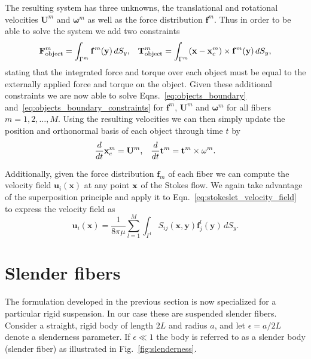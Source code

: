 The resulting system has three unknowns, the translational and rotational velocities $\mathbf{U}^m$ and $\mathbf{\omega}^m$ as well as the force distribution $\mathbf{f}^m$. Thus in order to be able to solve the system we add two constraints
\begin{equation}
	\label{eq:objects_boundary_constraints}
	\mathbf{F}_{\text{object}}^m = \int_{\Gamma^m} \mathbf{f}^m(\mathbf{y}) \, dS_y\text{,} \quad \mathbf{T}_{\text{object}}^m = \int_{\Gamma^m} (\mathbf{x} - \mathbf{x}_c^m) \times \mathbf{f}^m(\mathbf{y}) \, dS_y \text{,}
\end{equation}
stating that the integrated force and torque over each object must be equal to the externally applied force and torque on the object. Given these additional constraints we are now able to solve Eqns.~\eqref{eq:objects_boundary} and~\eqref{eq:objects_boundary_constraints} for $\mathbf{f}^m$, $\mathbf{U}^m$ and $\mathbf{\omega}^m$ for all fibers $m=1,2,\dots,M$. Using the resulting velocities we can then simply update the position and orthonormal basis of each object through time $t$ by
\begin{equation}
	\label{eq:objects_update}
	\frac{d}{dt}\mathbf{x}_c^m = \mathbf{U}^m \text{,} \quad \frac{d}{dt}\mathbf{t}^m = \mathbf{t}^m \times \mathbf{\omega}^m \text{.}
\end{equation}

Additionally, given the force distribution $\mathbf{f}_m$ of each fiber we can compute the velocity field $\mathbf{u}_i(\mathbf{x})$ at any point $\mathbf{x}$ of the Stokes flow. We again take advantage of the superposition principle and apply it to Eqn.~\eqref{eq:stokeslet_velocity_field} to express the velocity field as
\begin{equation}
	\label{eq:objects_velocity_field}
	\mathbf{u}_i(\mathbf{x}) = \frac{1}{8 \pi \mu} \sum_{l=1}^M \int_{\Gamma^l} S_{ij}(\mathbf{x},\mathbf{y})\mathbf{f}_j^l(\mathbf{y}) \, dS_y\text{.}
\end{equation}

\section{Slender fibers}
\label{sec:slender_fibers}

The formulation developed in the previous section is now specialized for a particular rigid suspension. In our case these are suspended slender fibers. Consider a straight, rigid body of length $2L$ and radius $a$, and let $\epsilon = a / 2 L$ denote a slenderness parameter. If $\epsilon \ll 1$ the body is referred to as a slender body (slender fiber) as illustrated in Fig.~\ref{fig:slenderness}.

